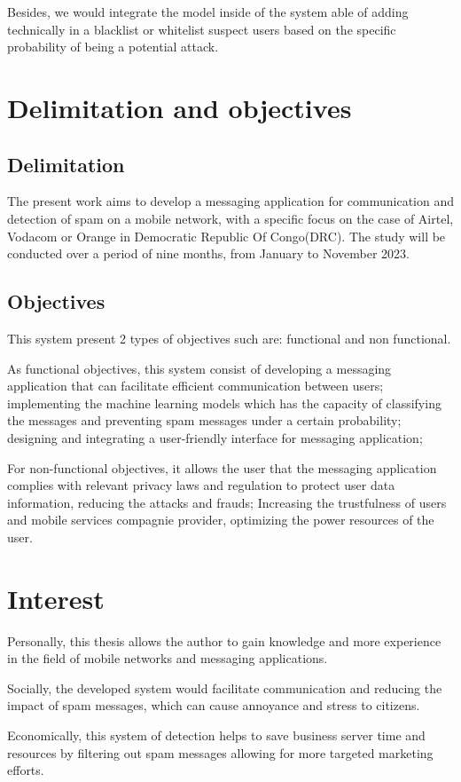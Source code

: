 \documentclass[12pt,a4paper]{report}
\begin{document}
	 Besides, we would integrate the model inside of the system able of adding technically in a blacklist or whitelist suspect users based on the specific probability of being a potential attack. 
	\section{Delimitation and objectives}  
	\subsection{Delimitation}
	The present work aims to develop a messaging application for communication and detection of spam on a mobile network, with a specific focus on the case of Airtel, Vodacom or Orange in Democratic Republic Of Congo(DRC). The study will be conducted over a period of nine months, from January to November 2023. 
	\subsection{Objectives}
	This system present 2 types of objectives such are: functional and non functional.
	
	As functional objectives, this system consist of developing a messaging application that can facilitate efficient communication between users; implementing the machine learning models which has the capacity of classifying the messages and preventing spam messages under a certain probability; designing and integrating a user-friendly interface for messaging application;  
	
	For non-functional objectives, it allows the user that the messaging application complies with relevant privacy laws and regulation to protect user data information, reducing the attacks and frauds; Increasing the trustfulness of users and mobile services compagnie provider, optimizing the power resources of the user. 
	
	\section{Interest} 
	Personally, this thesis allows the author to gain knowledge and more experience in the field of mobile networks and messaging applications. 
	
	Socially, the developed system would facilitate communication and reducing the impact of spam messages, which can cause annoyance and stress to citizens. 
	
	Economically, this system of detection helps to save business server time and resources by filtering out spam messages allowing for more targeted marketing efforts. 
	
\end{document}

